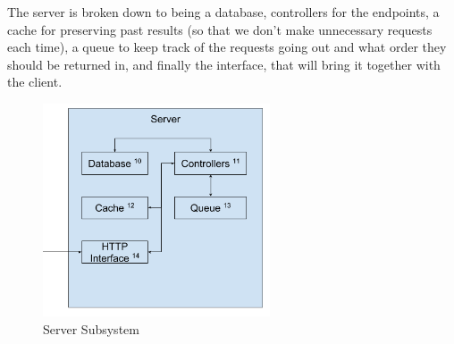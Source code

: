 The server is broken down to being a database, controllers for the endpoints, a cache for preserving past results (so that we don't make unnecessary requests each time), a queue to keep track of the requests going out and what order they should be returned in, and finally the interface, that will bring it together with the client.

\begin{figure}[h!]
	\centering
 	\includegraphics[width=0.60\textwidth]{images/server/ADS-SDS-Server.png}
 	\caption{Server Subsystem}
\end{figure}

\newpage
